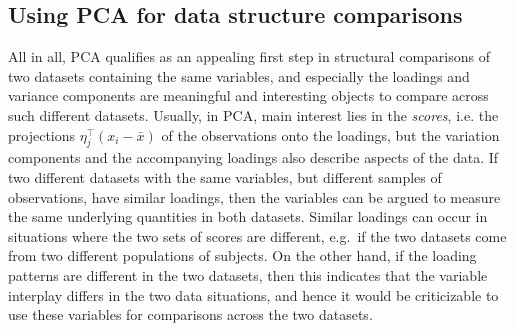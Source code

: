 \documentclass[a4paper,14pt]{article}
\begin{document}
\subsection*{Using PCA for data structure comparisons}


All in all, PCA qualifies as an appealing first step in structural comparisons of two datasets containing the same variables, and especially the loadings and variance components are meaningful and interesting objects to compare across such different datasets. Usually, in PCA, main interest lies in the \textit{scores}, i.e. the projections $\eta_j^\top (x_i - \bar{x})$ of the observations onto the loadings, but the variation components and the accompanying loadings also describe aspects of the data. If two different datasets with the same variables, but different samples of observations, have similar loadings, then the variables can be argued to measure the same underlying quantities in both datasets. Similar loadings can occur in situations where the two sets of scores are different, e.g.\ if the two datasets come from two different populations of subjects. On the other hand, if the loading patterns are different in the two datasets, then this indicates that the variable interplay differs in the two data situations, and hence it would be criticizable to use these variables for comparisons across the two datasets.
\end{document}
